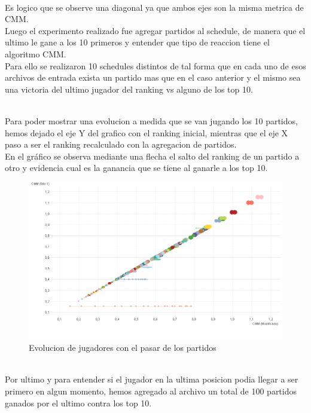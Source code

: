 \\
Es logico que se observe una diagonal ya que ambos ejes son la misma metrica de CMM.
\\
Luego el experimento realizado fue agregar partidos al schedule, de manera que el ultimo le gane a los 10 primeros y entender que tipo de reaccion tiene el algoritmo CMM.
\\
Para ello se realizaron 10 schedules distintos de tal forma que en cada uno de esos archivos de entrada exista un partido mas que en el caso anterior y
el mismo sea una victoria del ultimo jugador del ranking vs alguno de los top 10.

\\
Para poder mostrar una evolucion a medida que se van jugando los 10 partidos, hemos dejado el eje Y del grafico con el ranking inicial, mientras que el eje X paso a ser el ranking recalculado con la agregacion de partidos.\\
En el gráfico se observa mediante una flecha el salto del ranking de un partido a otro y evidencia cual es la ganancia que se tiene al ganarle a los top 10. 
\\

\begin{figure}[H]
\centering
\includegraphics[width=1\textwidth]{IMG/comparativa cmm -cmm foto 10.png}
\caption{Evolucion de jugadores con el pasar de los partidos}
\label{fig:Evolucion de jugadores con el pasar de los partidos}
\end{figure}

\\
Por ultimo y para entender si el jugador en la ultima posicion podia llegar a ser primero en algun momento, hemos agregado al archivo un total de 100 partidos ganados por el ultimo contra 
los top 10.
\\

